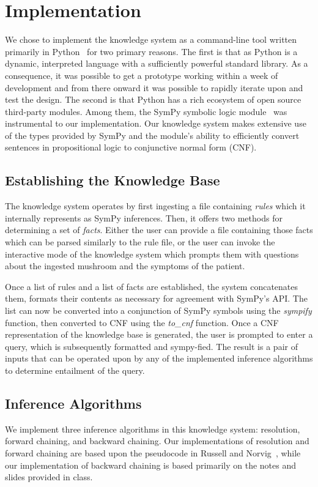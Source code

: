 \documentclass[12pt, conference, compsocconf]{IEEEtran}
\begin{document}
\section{Implementation}
We chose to implement the knowledge system as a command-line tool written primarily in Python~\cite{python-doc} for two primary reasons. 
The first is that as Python is a dynamic, interpreted language with a sufficiently powerful standard library. As a consequence, it was possible to get a prototype working within a week of development and from there onward it was possible to rapidly iterate upon and test the design. 
The second is that Python has a rich ecosystem of open source third-party modules. Among them, the SymPy symbolic logic module~\cite{sympy-doc} was instrumental to our implementation. Our knowledge system makes extensive use of the types provided by SymPy and the module's ability to efficiently convert sentences in propositional logic to conjunctive normal form (CNF).

\subsection{Establishing the Knowledge Base}
The knowledge system operates by first ingesting a file containing \emph{rules} which it internally represents as SymPy inferences. 
Then, it offers two methods for determining a set of \emph{facts}. 
Either the user can provide a file containing those facts which can be parsed similarly to the rule file, or the user can invoke the interactive mode of the knowledge system which prompts them with questions about the ingested mushroom and the symptoms of the patient. 

Once a list of rules and a list of facts are established, the system concatenates them, formats their contents as necessary for agreement with SymPy's API. 
The list can now be converted into a conjunction of SymPy symbols using the \emph{sympify} function, then converted to CNF using the \emph{to\_cnf} function. 
Once a CNF representation of the knowledge base is generated, the user is prompted to enter a query, which is subsequently formatted and sympy-fied. The result is a pair of inputs that can be operated upon by any of the implemented inference algorithms to determine entailment of the query. 

\subsection{Inference Algorithms}
We implement three inference algorithms in this knowledge system: resolution, forward chaining, and backward chaining. 
Our implementations of resolution and forward chaining are based upon the pseudocode in Russell and Norvig~\cite{russell-norvig-aima}, while our implementation of backward chaining is based primarily on the notes and slides provided in class. 
\end{document}
